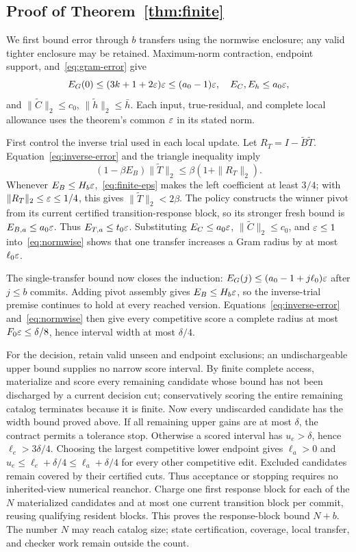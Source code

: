 \subsection{Proof of Theorem~\ref{thm:finite}}
\label{app:finite}

We first bound error through $b$ transfers using the normwise enclosure; any valid tighter enclosure may be retained. Maximum-norm contraction, endpoint support, and~\eqref{eq:gram-error} give
\[
 E_G(0)\le(3k+1+2\varepsilon)\varepsilon\le(a_0-1)\varepsilon,
 \quad E_C,E_h\le a_0\varepsilon,
\]
and $\|\widetilde C\|_2\le c_0$, $\|\widetilde h\|_2\le\bar h$. Each input, true-residual, and complete local allowance uses the theorem's common $\varepsilon$ in its stated norm.

First control the inverse trial used in each local update. Let $R_T=I-\widetilde B\widetilde T$. Equation~\eqref{eq:inverse-error} and the triangle inequality imply
\[
 (1-\beta E_B)\|\widetilde T\|_2
 \le\beta(1+\|R_T\|_2).
\]
Whenever $E_B\le H_b\varepsilon$,~\eqref{eq:finite-eps} makes the left coefficient at least $3/4$; with $\|R_T\|_2\le\varepsilon\le1/4$, this gives $\|\widetilde T\|_2<2\beta$. The policy constructs the winner pivot from its current certified transition-response block, so its stronger fresh bound is $E_{B,a}\le a_0\varepsilon$. Thus $E_{T,a}\le t_0\varepsilon$. Substituting $E_C\le a_0\varepsilon$, $\|\widetilde C\|_2\le c_0$, and $\varepsilon\le1$ into~\eqref{eq:normwise} shows that one transfer increases a Gram radius by at most $\ell_0\varepsilon$.

The single-transfer bound now closes the induction: $E_G(j)\le(a_0-1+j\ell_0)\varepsilon$ after $j\le b$ commits. Adding pivot assembly gives $E_B\le H_b\varepsilon$, so the inverse-trial premise continues to hold at every reached version. Equations~\eqref{eq:inverse-error} and~\eqref{eq:normwise} then give every competitive score a complete radius at most $F_0\varepsilon\le\delta/8$, hence interval width at most $\delta/4$.

For the decision, retain valid unseen and endpoint exclusions; an undischargeable upper bound supplies no narrow score interval. By finite complete access, materialize and score every remaining candidate whose bound has not been discharged by a current decision cut; conservatively scoring the entire remaining catalog terminates because it is finite. Now every undiscarded candidate has the width bound proved above. If all remaining upper gains are at most $\delta$, the contract permits a tolerance stop. Otherwise a scored interval has $u_e>\delta$, hence $\ell_e>3\delta/4$. Choosing the largest competitive lower endpoint gives $\ell_a>0$ and $u_e\le\ell_e+\delta/4\le\ell_a+\delta/4$ for every other competitive edit. Excluded candidates remain covered by their certified cuts. Thus acceptance or stopping requires no inherited-view numerical reanchor. Charge one first response block for each of the $N$ materialized candidates and at most one current transition block per commit, reusing qualifying resident blocks. This proves the response-block bound $N+b$. The number $N$ may reach catalog size; state certification, coverage, local transfer, and checker work remain outside the count.
